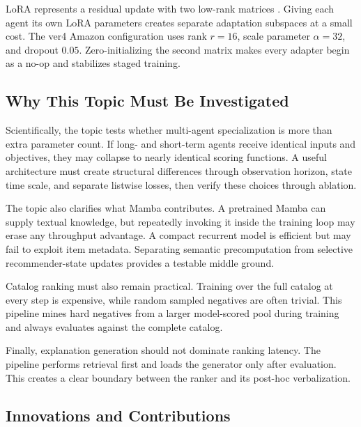 \documentclass[11pt,a4paper]{article}
\begin{document}
LoRA represents a residual update with two low-rank matrices \cite{LORA}. Giving each agent its own LoRA parameters creates separate adaptation subspaces at a small cost. The ver4 Amazon configuration uses rank $r=16$, scale parameter $\alpha=32$, and dropout $0.05$. Zero-initializing the second matrix makes every adapter begin as a no-op and stabilizes staged training.

\subsection{Why This Topic Must Be Investigated}

Scientifically, the topic tests whether multi-agent specialization is more than extra parameter count. If long- and short-term agents receive identical inputs and objectives, they may collapse to nearly identical scoring functions. A useful architecture must create structural differences through observation horizon, state time scale, and separate listwise losses, then verify these choices through ablation.

The topic also clarifies what Mamba contributes. A pretrained Mamba can supply textual knowledge, but repeatedly invoking it inside the training loop may erase any throughput advantage. A compact recurrent model is efficient but may fail to exploit item metadata. Separating semantic precomputation from selective recommender-state updates provides a testable middle ground.

Catalog ranking must also remain practical. Training over the full catalog at
every step is expensive, while random sampled negatives are often trivial.
This pipeline mines hard negatives from a larger model-scored pool during
training and always evaluates against the complete catalog.

Finally, explanation generation should not dominate ranking latency. The pipeline performs retrieval first and loads the generator only after evaluation. This creates a clear boundary between the ranker and its post-hoc verbalization.

\subsection{Innovations and Contributions}
\end{document}
